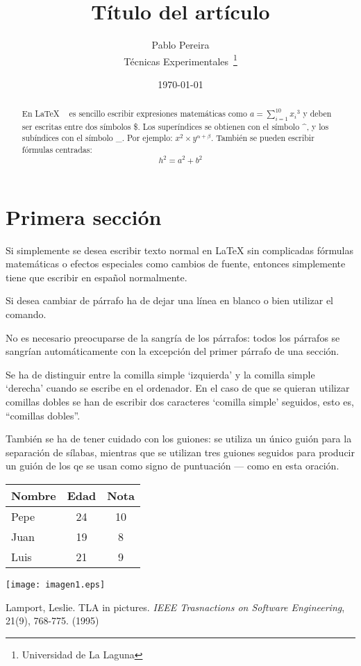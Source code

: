 \documentclass[a4paper,12pt]{article}
\begin{document}
\title{Título del artículo}
\author{Pablo Pereira \\
Técnicas Experimentales~\footnote{Universidad de La Laguna}
}
\date{\today}
\maketitle
\begin{abstract}
En \LaTeX{} ~\cite{Lam:86} es sencillo escribir expresiones
matemáticas como $a=\sum_{i=1}^{10} {x_i}^{3}$
y deben ser escritas entre dos símbolos \$.
Los superíndices se obtienen con el símbolo \^{}, y
los subíndices con el símbolo \_.
Por ejemplo: $x^2 \times y^{\alpha + \beta}$.
También se pueden escribir fórmulas centradas:
\[h^2=a^2 + b^2 \]
\end{abstract}

\section{Primera sección}
Si simplemente se desea escribir texto normal en LaTeX
sin complicadas f\'ormulas matem\'aticas o efectos especiales
como cambios de fuente, entonces simplemente tiene que escribir 
en espa\~nol normalmente. \par
Si desea cambiar de párrafo ha de dejar una línea en blanco o bien
utilizar el comando. \par
No es necesario preocuparse de la sangría de los párrafos:
todos los párrafos se sangrían automáticamente con la excepción 
del primer párrafo de una sección.

Se ha de distinguir entre la comilla simple `izquierda' 
y la comilla simple `derecha' cuando se escribe en el ordenador.
En el caso de que se quieran utilizar comillas dobles se han de 
escribir dos caracteres  `comilla simple' seguidos, esto es,
``comillas dobles''.

También se ha de tener cuidado con los guiones: se utiliza un único
guión para la separación de sílabas, mientras que se utilizan 
tres guiones seguidos para producir un guión de los qe se usan 
como signo de puntuación --- como en esta oración.

\bigskip
\begin{tabular}{|l|c|c|}
\hline
Nombre & Edad & Nota \\ \hline
Pepe & 24 & 10 \\ \hline
Juan & 19 & 8 \\ \hline
Luis & 21 & 9 \\ \hline
\end{tabular}

\bigskip
\texttt{[image: imagen1.eps]}


\begin{thebibliography}{00}
Lamport, Leslie.
TLA in pictures.
\emph{IEEE Trasnactions on Software Engineering},
21(9), 768-775.
(1995)
\end{thebibliography}
\end{document}
